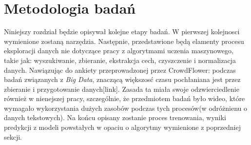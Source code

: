 
\chapter{Metodologia badań}
Niniejszy rozdział będzie opisywał kolejne etapy badań. W pierwszej kolejnosci wymienione zostaną narzędzia. Następnie, przedstawione będą elamenty procesu eksploracji danych nie dotyczące pracy z algorytmami uczenia maszynowego, takie jak: wyszukiwanie, zbieranie, ekstrakcja cech, czyszczenie i normalizacja danych.  Nawiązując do ankiety przeprowadzonej przez CrowdFlower:  podczas badań związanych z {\em Big Data}, znaczącą większosć czasu pochłaniana jest przez  zbieranie i  przygotowanie danych[link]. Zasada ta miała swoje odzwierciedlenie również w nienejszej pracy, szczególnie, że przedmiotem badań było wideo, które wymagało wykorzystania dużych zasobów  podczas tych procesów(w odróżnienu o danych tekstowych). Na końcu opisany zostanie proces trenowania, wyniki predykcji z modeli powstałych w opaciu o algorytmy wymienione z poprzedniej sekcji.
\label{cha:pierwszyDokument}

